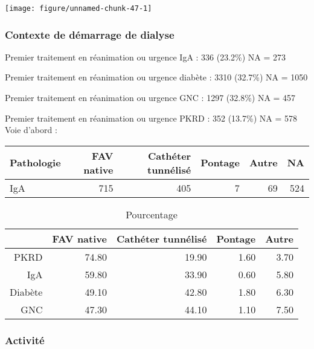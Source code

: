 \documentclass[11pt,a4paper]{article}\usepackage[]{graphicx}\usepackage[]{color}
\makeatletter
\def\maxwidth{ %
  \ifdim\Gin@nat@width>\linewidth
    \linewidth
  \else
    \Gin@nat@width
  \fi
}
\makeatother
\begin{document}
\texttt{[image: figure/unnamed-chunk-47-1]} 


    \subsubsection{Contexte de démarrage de dialyse}



    
Premier traitement en réanimation ou urgence IgA :  336 (23.2\%) NA = 273

Premier traitement en réanimation ou urgence diabète :  3310 (32.7\%) NA = 1050

Premier traitement en réanimation ou urgence GNC :  1297 (32.8\%) NA = 457

Premier traitement en réanimation ou urgence PKRD :  352 (13.7\%) NA = 578
~\\

Voie d’abord :
\begin{table}[ht]
\centering
\begin{tabular}{lrrrrr}
  \hline
Pathologie & FAV native & Cathéter tunnélisé & Pontage & Autre & NA \\ 
  \hline
IgA & 715 & 405 &   7 &  69 & 524 \\ 
   \hline
\end{tabular}
\end{table}
\begin{table}[ht]
\centering
\begin{tabular}{rrrrr}
  \hline
 & FAV native & Cathéter tunnélisé & Pontage & Autre \\ 
  \hline
PKRD & 74.80 & 19.90 & 1.60 & 3.70 \\ 
  IgA & 59.80 & 33.90 & 0.60 & 5.80 \\ 
  Diabète & 49.10 & 42.80 & 1.80 & 6.30 \\ 
  GNC & 47.30 & 44.10 & 1.10 & 7.50 \\ 
   \hline
\end{tabular}
\caption{Pourcentage} 
\end{table}


    \subsubsection{Activité}
\end{document}
